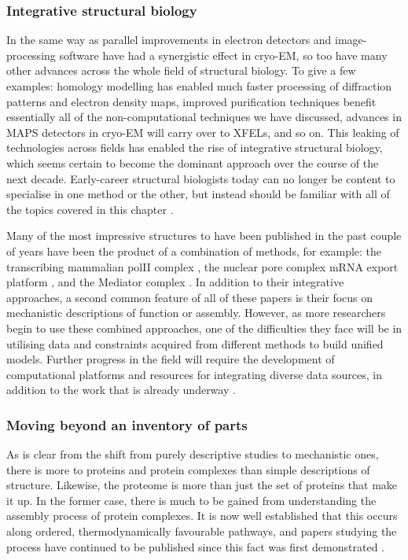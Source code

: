 \documentclass[a4paper,11pt,twoside,openright]{scrbook}
\begin{document}
\subsubsection{Integrative structural biology}
In the same way as parallel improvements in electron detectors and image-processing software have had a synergistic effect in cryo-EM, so too have many other advances across the whole field of structural biology. To give a few examples: homology modelling has enabled much faster processing of diffraction patterns and electron density maps, improved purification techniques benefit essentially all of the non-computational techniques we have discussed, advances in MAPS detectors in cryo-EM will carry over to XFELs, and so on. This leaking of technologies across fields has enabled the rise of integrative structural biology, which seems certain to become the dominant approach over the course of the next decade. Early-career structural biologists today can no longer be content to specialise in one method or the other, but instead should be familiar with all of the topics covered in this chapter \cite{Shi2014,Cassiday2014}.

Many of the most impressive structures to have been published in the past couple of years have been the product of a combination of methods, for example: the transcribing mammalian polII complex \cite{Bernecky2016}, the nuclear pore complex mRNA export platform \cite{Fernandez-Martinez2016}, and the Mediator complex \cite{Tsai2017}. In addition to their integrative approaches, a second common feature of all of these papers is their focus on mechanistic descriptions of function or assembly. However, as more researchers begin to use these combined approaches, one of the difficulties they face will be in utilising data and constraints acquired from different methods to build unified models. Further progress in the field will require the development of computational platforms and resources for integrating diverse data sources, in addition to the work that is already underway \cite{Russel2012,Schneidman-Duhovny2014,Sali2015}.

\subsubsection{Moving beyond an inventory of parts}
As is clear from the shift from purely descriptive studies to mechanistic ones, there is more to proteins and protein complexes than simple descriptions of structure. Likewise, the proteome is more than just the set of proteins that make it up. In the former case, there is much to be gained from understanding the assembly process of protein complexes. It is now well established that this occurs along ordered, thermodynamically favourable pathways, and papers studying the process have continued to be published since this fact was first demonstrated \cite{Levy2008a,Marsh2013,Appolaire2014,Macek2017,Mallik2017}.
\end{document}
